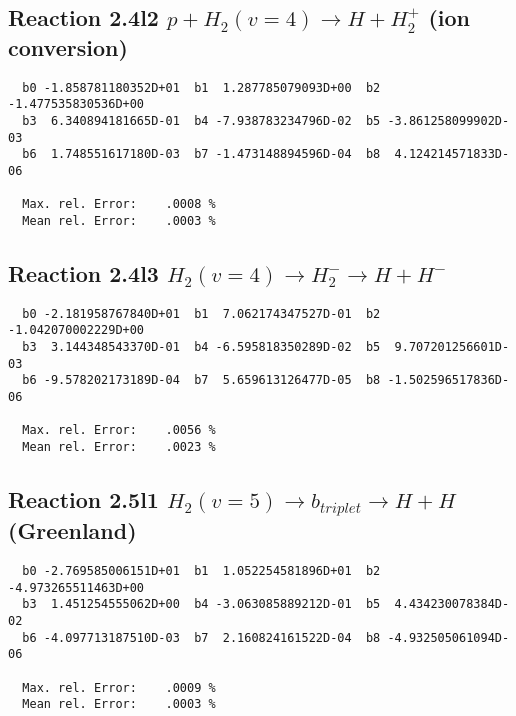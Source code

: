 \documentclass[12pt]{article}
\begin{document}
\subsection{
Reaction 2.4l2
$ p + H_2(v=4) \rightarrow H + H_2^+$ (ion conversion)
}


\begin{small}\begin{verbatim}
  b0 -1.858781180352D+01  b1  1.287785079093D+00  b2 -1.477535830536D+00
  b3  6.340894181665D-01  b4 -7.938783234796D-02  b5 -3.861258099902D-03
  b6  1.748551617180D-03  b7 -1.473148894596D-04  b8  4.124214571833D-06

  Max. rel. Error:    .0008 %
  Mean rel. Error:    .0003 %

\end{verbatim}\end{small}


\subsection{
Reaction 2.4l3
 $ H_2(v=4) \rightarrow H_2^- \rightarrow H + H^-$
}


\begin{small}\begin{verbatim}
  b0 -2.181958767840D+01  b1  7.062174347527D-01  b2 -1.042070002229D+00
  b3  3.144348543370D-01  b4 -6.595818350289D-02  b5  9.707201256601D-03
  b6 -9.578202173189D-04  b7  5.659613126477D-05  b8 -1.502596517836D-06

  Max. rel. Error:    .0056 %
  Mean rel. Error:    .0023 %

\end{verbatim}\end{small}


\newpage
\subsection{
Reaction 2.5l1
$ H_2(v=5) \rightarrow b_{triplet}\rightarrow H + H $ (Greenland) 
}


\begin{small}\begin{verbatim}
  b0 -2.769585006151D+01  b1  1.052254581896D+01  b2 -4.973265511463D+00
  b3  1.451254555062D+00  b4 -3.063085889212D-01  b5  4.434230078384D-02
  b6 -4.097713187510D-03  b7  2.160824161522D-04  b8 -4.932505061094D-06

  Max. rel. Error:    .0009 %
  Mean rel. Error:    .0003 %

\end{verbatim}\end{small}
\end{document}
